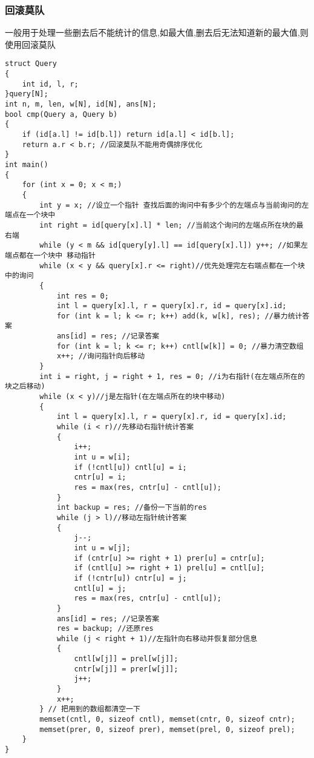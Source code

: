 \documentclass[a4paper, fontset=none]{ctexart}
\begin{document}
\subsubsection{回滚莫队}
一般用于处理一些删去后不能统计的信息,如最大值,删去后无法知道新的最大值,则使用回滚莫队
\begin{verbatim}
struct Query
{
    int id, l, r;
}query[N];
int n, m, len, w[N], id[N], ans[N];
bool cmp(Query a, Query b)
{
    if (id[a.l] != id[b.l]) return id[a.l] < id[b.l];
    return a.r < b.r; //回滚莫队不能用奇偶排序优化
}
int main()
{
    for (int x = 0; x < m;)
    {
        int y = x; //设立一个指针 查找后面的询问中有多少个的左端点与当前询问的左端点在一个块中
        int right = id[query[x].l] * len; //当前这个询问的左端点所在块的最右端
        while (y < m && id[query[y].l] == id[query[x].l]) y++; //如果左端点都在一个块中 移动指针
        while (x < y && query[x].r <= right)//优先处理完左右端点都在一个块中的询问
        {
            int res = 0;
            int l = query[x].l, r = query[x].r, id = query[x].id;
            for (int k = l; k <= r; k++) add(k, w[k], res); //暴力统计答案
            ans[id] = res; //记录答案
            for (int k = l; k <= r; k++) cntl[w[k]] = 0; //暴力清空数组
            x++; //询问指针向后移动
        }
        int i = right, j = right + 1, res = 0; //i为右指针(在左端点所在的块之后移动)
        while (x < y)//j是左指针(在左端点所在的块中移动)
        {
            int l = query[x].l, r = query[x].r, id = query[x].id;
            while (i < r)//先移动右指针统计答案
            {
                i++;
                int u = w[i];
                if (!cntl[u]) cntl[u] = i;
                cntr[u] = i;
                res = max(res, cntr[u] - cntl[u]);
            }
            int backup = res; //备份一下当前的res
            while (j > l)//移动左指针统计答案
            {
                j--;
                int u = w[j];
                if (cntr[u] >= right + 1) prer[u] = cntr[u];
                if (cntl[u] >= right + 1) prel[u] = cntl[u];
                if (!cntr[u]) cntr[u] = j;
                cntl[u] = j;
                res = max(res, cntr[u] - cntl[u]);
            }
            ans[id] = res; //记录答案
            res = backup; //还原res
            while (j < right + 1)//左指针向右移动并恢复部分信息
            {
                cntl[w[j]] = prel[w[j]];
                cntr[w[j]] = prer[w[j]];
                j++;
            }
            x++;
        } // 把用到的数组都清空一下
        memset(cntl, 0, sizeof cntl), memset(cntr, 0, sizeof cntr);
        memset(prer, 0, sizeof prer), memset(prel, 0, sizeof prel);
    }
}
\end{verbatim}
\end{document}
